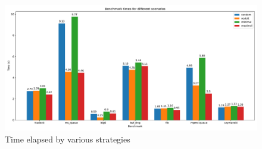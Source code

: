\begin{figure}[htbp] 
	\centering
	\includegraphics[scale=0.39]{figure/genmc/overhead.pdf} 
	\caption{Time elapsed by various strategies} 
	\label{genmc:overhead} 
\end{figure} 




